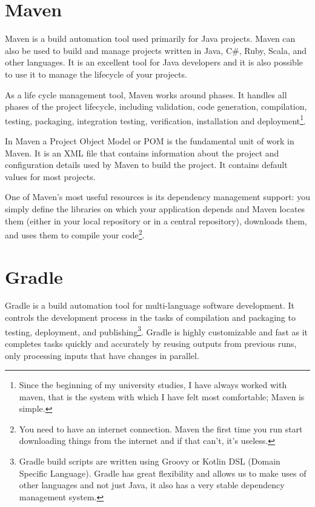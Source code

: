 \documentclass[a4paper,11pt]{article}
\begin{document}
\section{Maven}
Maven is a build automation tool used primarily for Java projects. Maven can 
also be used to build and manage projects written in Java, C\#, Ruby, Scala, 
and other languages\cite{MAVEN:1}. It is an excellent tool for Java developers 
and it is also possible to use it to manage the lifecycle of your projects.

As a life cycle management tool, Maven works around phases. It handles all 
phases of the project lifecycle, including validation, code generation, 
compilation, testing, packaging, integration testing, verification, 
installation and deployment\footnote{Since the beginning of my university 
studies, I have always worked with maven, that is the system with which I have 
felt most comfortable; Maven is simple.}.

In Maven a Project Object Model or POM is the fundamental unit of work in Maven.
It is an XML file that contains information about the project and configuration
details used by Maven to build the project. It contains default values for most
projects\cite{APACHE:1}.

One of Maven's most useful resources is its dependency management support: you 
simply define the libraries on which your application depends and Maven locates
them (either in your local repository or in a central repository), downloads 
them, and uses them to compile your code\footnote{You need to have an internet 
connection.  Maven the first time you run start downloading things from the 
internet and if that can't, it's useless.}.

\section{Gradle}
Gradle is a build automation tool for multi-language software development. It 
controls the development process in the tasks of compilation and packaging to 
testing, deployment, and publishing\cite{GRADLE:1}\footnote{Gradle build scripts 
are written using Groovy or Kotlin DSL (Domain Specific Language). Gradle has 
great flexibility and allows us to make uses of other languages and not just 
Java, it also has a very stable dependency management system.}. Gradle is 
highly customizable and fast as it completes tasks quickly and accurately by 
reusing outputs from previous runs, only processing inputs that have changes 
in parallel.
\end{document}
